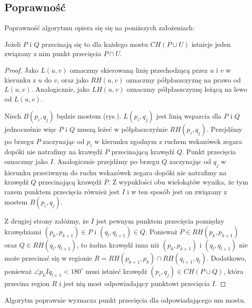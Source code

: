 \subsection{Poprawność}
Poprawność algorytmu opiera się się na poniższych założeniach:

\begin{lemat}
  Jeżeli $P$ i $Q$ przecinają się to dla każdego mostu $CH(P \cup U)$
  istnieje jeden związany z nim punkt przecięcia $P \cap U$.
\end{lemat}

\begin{proof}
  Jako $L(u, v)$ oznaczmy skierowaną linię przechodzącą przez $u$ i
  $v$ w kierunku z $u$ do $v$, oraz jako $RH(u, v)$ oznaczmy
  półpłaszczyznę na prawo od $L(u, v)$. Analogicznie, jako $LH(u, v)$
  oznaczmy półpłaszczyznę leżącą na lewo od $L(u, v)$.

  Niech $B(p_i, q_j)$ będzie mostem (rys.). $L(p_i, q_j)$ jest linią
  wsparcia dla $P$ i $Q$ jednocześnie więc $P$ i $Q$ muszą leżeć w
  półpłaszczyźnie $RH(p_i, q_j)$. Przejdźmy po brzegu $P$ zaczynając
  od $p_i$ w kierunku zgodnym z ruchem wskazówek zegara dopóki nie
  natrafimy na krawędź $P$ przecinającą krawędź $Q$. Punkt przecięcia
  oznaczmy jako $I$. Analogicznie przejdźmy po brzegu $Q$ zaczynając
  od $q_j$ w kierunku przeciwnym do ruchu wskazówek zegara dopóki nie
  natrafimy na krawędź $Q$ przecinającą krawędź $P$. Z wypukłości obu
  wielokątów wynika, że tym razem punktem przecięcia również jest $I$
  i w ten sposób jest on związany z mostem $B(p_i, q_j)$.

  Z drugiej strony załóżmy, że $I$ jest pewnym punktem przecięcia
  pomiędzy krawędziami $(p_k, p_{k+1}) \in P$ i $(q_l, q_{l+1}) \in
  Q$. Ponieważ $P \in RH(p_k, p_{k+1})$ oraz $Q \in RH(q_l, q_{l+1})$,
  to żadna krawędź inna niż $(p_k, p_{k+1})$ i $(q_l, q_{l+1})$ nie
  może przecinać się w regionie $R = RH(p_{k+1}, p_k) \cap RH(q_{l+1},
  q_l)$. Dodatkowo, ponieważ $\angle p_{k}Iq_{l+1} < 180^{\circ}$ musi
  istnieć krawędź $(p_i, q_j) \in CH(P \cup Q)$, która przecina region
  $R$ i jest nią most odpowiadający punktowi przecięcia $I$.
\end{proof}

\begin{lemat}
  Algorytm poprawnie wyznacza punkt przecięcia dla odpowiadającego mu
  mostu.
\end{lemat}

